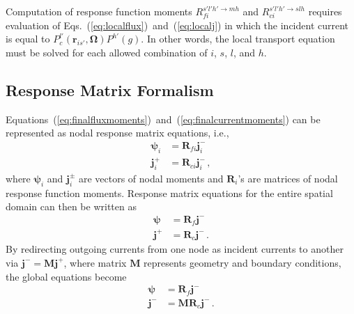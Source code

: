 \documentclass[5p,times,twocolumn,10pt]{elsarticle}
\newcommand{\EQSTWO}[2]{Eqs.~(\ref{#1})~and~(\ref{#2})}            %
\newcommand{\EQUATIONSTWO}[2]{Equations~(\ref{#1})~and~(\ref{#2})}             %
\begin{document}
  Computation of response function moments $R^{s'l'h' \to mh}_{fi}$ and 
  $R^{s'l'h' \to slh}_{ci}$ requires evaluation 
  of \EQSTWO{eq:localflux}{eq:localj} in which the incident current 
  is equal to $P^{l'}_c(\mathbf{r}_{is'}, \bm{\Omega}) P^{h'}(g)$. In other words,
  the local transport equation must be solved for each allowed combination 
  of $i$, $s$, $l$, and $h$.
  
  
  \subsection{Response Matrix Formalism}
  
  \EQUATIONSTWO{eq:finalfluxmoments}{eq:finalcurrentmoments} can
  be represented as nodal response matrix equations, i.e.,
  \begin{equation}
    \begin{split}
      \bm{\psi}_i    &=  \mathbf{R}_{fi}  \mathbf{j}^-_i  \\ 
      \mathbf{j}^+_i &=  \mathbf{R}_{ci} \mathbf{j}^-_i  \, ,
    \end{split}
  \end{equation}
  where  $\bm{\psi}_i$ and $\mathbf{j}^{\pm}_i$ are vectors 
  of nodal moments and $\mathbf{R}_i$'s are matrices of
  nodal response function moments. Response matrix equations for the entire 
  spatial domain can then be written as
  \begin{equation}
    \begin{split}
      \bm{\psi}    &= \mathbf{R}_{f} \mathbf{j}^-  \\
      \mathbf{j}^+ &= \mathbf{R}_{c}  \mathbf{j}^- \, .
    \end{split}
  \end{equation}
  By redirecting outgoing currents from one node as incident 
  currents to another via $\mathbf{j}^- = \mathbf{Mj}^+$, where 
  matrix $\mathbf{M}$ 
  represents geometry and boundary 
  conditions, the global 
  equations become
  \begin{equation}
    \begin{split}
      \bm{\psi}    &= \mathbf{R}_{f}  \mathbf{j}^-  \\
      \mathbf{j}^- &= \mathbf{MR}_{c}   \mathbf{j}^- \, .
      \label{eq:globalrme}
    \end{split}
  \end{equation}
  
\end{document}
